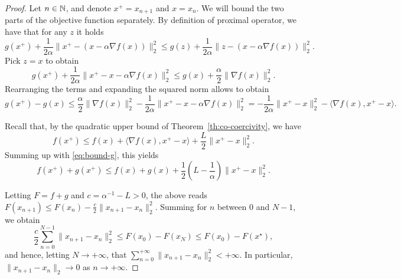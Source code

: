      \begin{proof}
%  
         Let $n\in\mathbb{N}$, and denote $x^+=x_{n+1}$ and $x=x_n$.
         We will bound the two parts of the objective function separately.
         By definition of proximal operator, we have that for any $z$ it holds
         \begin{equation}
             g(x^+) + \frac{1}{2\alpha}\|x^+-(x - \alpha \nabla f(x))\|_2^2
             \le g(z) + \frac{1}{2\alpha}\|z-(x - \alpha \nabla f(x))\|_2^2.
         \end{equation}
         Pick $z=x$ to obtain
         \begin{equation}
             g(x^+) + \frac{1}{2\alpha}\|x^+-x - \alpha \nabla f(x)\|_2^2
             \le g(x) + \frac{\alpha}{2}\|\nabla f(x)\|_2^2.
         \end{equation}
         Rearranging the terms and expanding the squared norm allows to obtain
         \begin{equation}
             \label{eq:bound-g}
             g(x^+) - g(x)
             \le\frac{\alpha}{2}\|\nabla f(x)\|_2^2 - \frac{1}{2\alpha}\|x^+-x - \alpha \nabla f(x)\|_2^2
             = -\frac{1}{2\alpha} \|x^+-x\|_2^2 -\langle \nabla f(x),x^+-x\rangle.
         \end{equation}
 
 
         Recall that, by the quadratic upper bound of Theorem~\ref{th:co-coercivity}, we have
         \begin{equation}
             f(x^+) \le f(x) + \langle\nabla f(x),x^+-x\rangle + \frac{L}{2}\|x^+-x\|_2^2.
         \end{equation}
         Summing up with \eqref{eq:bound-g}, this yields
         \begin{equation}
             f(x^+)+g(x^+) \le f(x)+g(x) +\frac{1}2\left(L-\frac1\alpha\right) \|x^+-x\|_2^2.
         \end{equation}
 
         Letting $F=f+g$ and $c=\alpha^{-1}-L>0$, the above reads $F(x_{n+1})\le F(x_n)-\frac c2\|x_{n+1}-x_n\|_2^2$. Summing for $n$ between $0$ and $N-1$, we obtain
         \begin{equation}
             \frac c2\sum_{n=0}^{N-1}\|x_{n+1}-x_n\|_2^2  \le F(x_0)-F(x_N) \le F(x_0)-F(x^\star),
         \end{equation}
         and hence, letting $N\to+\infty$, that $\sum_{n=0}^{+\infty}\|x_{n+1}-x_n\|_2^2<+\infty$.
         In particular, $\|x_{n+1}-x_n\|_2\rightarrow 0$ as $n\to +\infty$.
 

\end{proof}
